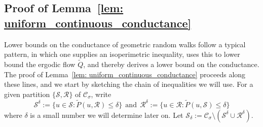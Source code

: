 \documentclass{report}
\newcommand{\1}{\mathbf{1}}
\newcommand{\mc}[1]{\mathcal{#1}}
\newcommand{\wt}[1]{\widetilde{#1}}
\theoremstyle{alden}
\theoremstyle{aldenthm}
\theoremstyle{definition}
\theoremstyle{remark}
\begin{document}
\subsection{Proof of Lemma~\ref{lem: uniform_continuous_conductance}}
Lower bounds on the conductance of geometric random walks follow a typical pattern, in which one supplies an isoperimetric inequality, uses this to lower bound the ergodic flow $\wt{Q}$, and thereby derives a lower bound on the conductance. The proof of Lemma~\ref{lem: uniform_continuous_conductance} proceeds along these lines, and we start by sketching the chain of inequalities we will use. For a given partition $\{\mc{S},\mc{R}\}$ of $\mc{C}_{\sigma}$, write
\begin{equation*}
\mc{S}^{\delta} := \biggl\{u \in \mc{S}: \wt{P}(u,\mc{R}) \leq \delta \biggr\}~~\textrm{and}~~\mc{R}^{\delta} := \biggl\{u \in \mc{R}: \wt{P}(u,\mc{S}) \leq \delta \biggr\} 
\end{equation*}
where $\delta$ is a small number we will determine later on. Let $\mc{S}_{\delta} := \mc{C}_{\sigma} \setminus (\mc{S}^{\delta} \cup \mc{R}^{\delta})$. 
\end{document}
